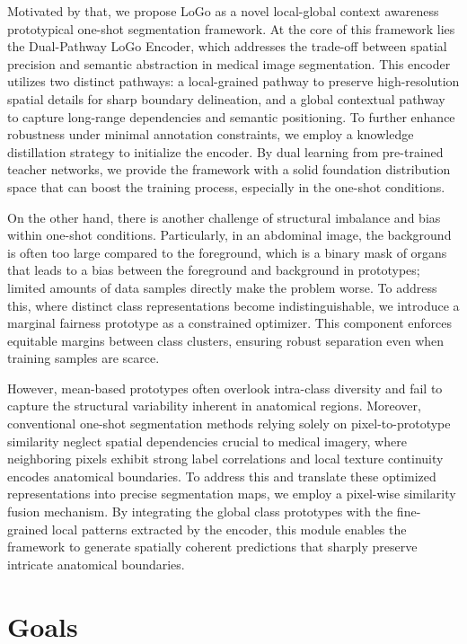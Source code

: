 Motivated by that, we propose LoGo as a novel local-global context awareness prototypical one-shot segmentation framework. At the core of this framework lies the Dual-Pathway LoGo Encoder, which addresses the trade-off between spatial precision and semantic abstraction in medical image segmentation. This encoder utilizes two distinct pathways: a local-grained pathway to preserve high-resolution spatial details for sharp boundary delineation, and a global contextual pathway to capture long-range dependencies and semantic positioning. To further enhance robustness under minimal annotation constraints, we employ a knowledge distillation strategy to initialize the encoder. By dual learning from pre-trained teacher networks, we provide the framework with a solid foundation distribution space that can boost the training process, especially in the one-shot conditions.

On the other hand, there is another challenge of structural imbalance and bias within one-shot conditions. Particularly, in an abdominal image, the background is often too large compared to the foreground, which is a binary mask of organs that leads to a bias between the foreground and background in prototypes; limited amounts of data samples directly make the problem worse. To address this, where distinct class representations become indistinguishable, we introduce a marginal fairness prototype as a constrained optimizer. This component enforces equitable margins between class clusters, ensuring robust separation even when training samples are scarce.

However, mean-based prototypes often overlook intra-class diversity and fail to capture the structural variability inherent in anatomical regions. Moreover, conventional one-shot segmentation methods relying solely on pixel-to-prototype similarity neglect spatial dependencies crucial to medical imagery, where neighboring pixels exhibit strong label correlations and local texture continuity encodes anatomical boundaries. To address this and translate these optimized representations into precise segmentation maps, we employ a pixel-wise similarity fusion mechanism. By integrating the global class prototypes with the fine-grained local patterns extracted by the encoder, this module enables the framework to generate spatially coherent predictions that sharply preserve intricate anatomical boundaries.

\newpage

\section{Goals}
\label{sec:intro-goals}

